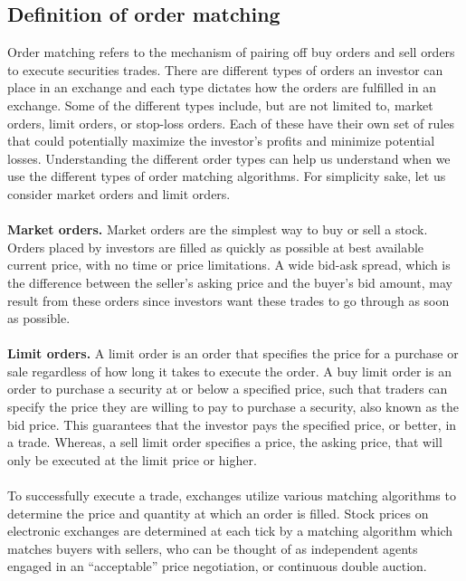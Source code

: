\documentclass{article}
\begin{document}
\subsection{Definition of order matching}
Order matching refers to the mechanism of pairing off buy orders and sell orders to execute securities trades. There are different types of orders an investor can place in an exchange and each type dictates how the orders are fulfilled in an exchange. Some of the different types include, but are not limited to, market orders, limit orders, or stop-loss orders. Each of these have their own set of rules that could potentially maximize the investor's profits and minimize potential losses. Understanding the different order types can help us understand when we use the different types of order matching algorithms. For simplicity sake, let us consider market orders and limit orders. \\\\
\textbf{Market orders. } Market orders are the simplest way to buy or sell a stock. Orders placed by investors are filled as quickly as possible at best available current price, with no time or price limitations. A wide bid-ask spread, which is the difference between the seller's asking price and the buyer's bid amount, may result from these orders since investors want these trades to go through as soon as possible.\\\\
\textbf{Limit orders. } A limit order is an order that specifies the price for a purchase or sale regardless of how long it takes to execute the order. A buy limit order is an order to purchase a security at or below a specified price, such that traders can specify the price they are willing to pay to purchase a security, also known as the bid price. This guarantees that the investor pays the specified price, or better, in a trade. Whereas, a sell limit order specifies a price, the asking price, that will only be executed at the limit price or higher.\\\\
To successfully execute a trade, exchanges utilize various matching algorithms to determine the price and quantity at which an order is filled. Stock prices on electronic exchanges are determined at each tick by a matching algorithm which matches buyers with sellers, who can be thought of as independent agents engaged in an “acceptable” price negotiation, or continuous double auction.
\end{document}
